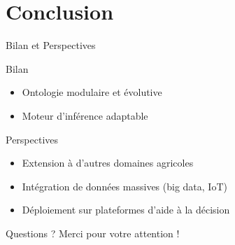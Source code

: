 \documentclass{beamer}
\begin{document}
\section{Conclusion}

\begin{frame}{Bilan et Perspectives}
  \begin{block}{Bilan}
    \begin{itemize}
      \item Ontologie modulaire et évolutive
      \item Moteur d’inférence adaptable
    \end{itemize}
  \end{block}
  \pause
  \begin{exampleblock}{Perspectives}
    \begin{itemize}
      \item Extension à d’autres domaines agricoles
      \item Intégration de données massives (big data, IoT)
      \item Déploiement sur plateformes d’aide à la décision
    \end{itemize}
  \end{exampleblock}
\end{frame}

\begin{frame}{Questions ?}
  \centering
  \Huge{Merci pour votre attention !}
\end{frame}
\end{document}
